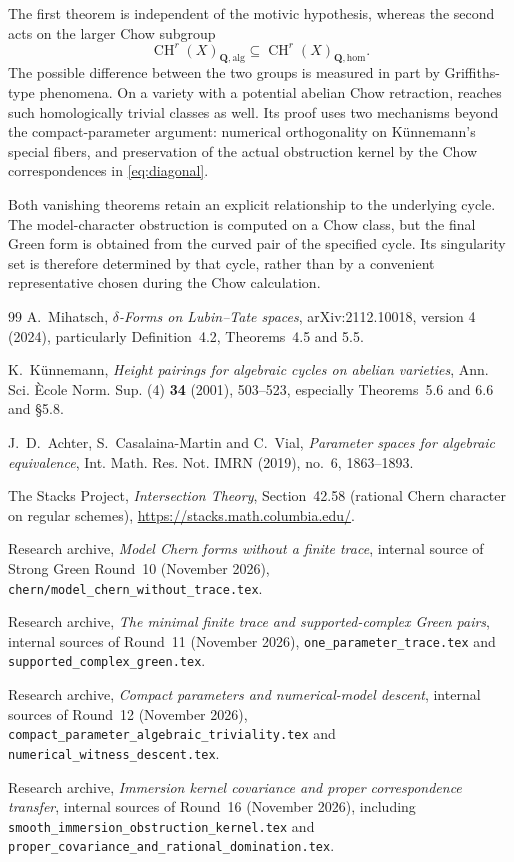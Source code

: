 \documentclass[11pt,reqno]{amsart}
\newcommand{\Eqref}[1]{{\hypersetup{linkcolor=mathpurple}\eqref{#1}}}
\theoremstyle{definition}
\theoremstyle{remark}
\newcommand{\Q}{\mathbf Q}
\newcommand{\CH}{\operatorname{CH}}
\newcommand{\alg}{\mathrm{alg}}
\newcommand{\homol}{\mathrm{hom}}
\numberwithin{equation}{section}
\begin{document}
The first theorem is independent of the motivic hypothesis, whereas
the second acts on the larger Chow subgroup
\[
 \CH^r(X)_{\Q,\alg}\subseteq\CH^r(X)_{\Q,\homol}.
\]
The possible difference between the two groups is measured in part
by Griffiths-type phenomena.  On a variety with a potential abelian
Chow retraction,  reaches such homologically
trivial classes as well.  Its proof uses two mechanisms beyond
the compact-parameter argument: numerical orthogonality on
K\"unnemann's special fibers, and preservation of the actual
obstruction kernel by the Chow correspondences in
\Eqref{eq:diagonal}.

Both vanishing theorems retain an explicit relationship to the
underlying cycle.  The model-character obstruction is computed
on a Chow class, but the final Green form is obtained from the
curved pair of the specified cycle.  Its singularity set is
therefore determined by that cycle, rather than by a convenient
representative chosen during the Chow calculation.

\begin{thebibliography}{99}
A.~Mihatsch, \emph{$\delta$-Forms on Lubin--Tate spaces},
arXiv:2112.10018, version 4 (2024), particularly Definition~4.2,
Theorems~4.5 and 5.5.

K.~K\"unnemann, \emph{Height pairings for algebraic cycles on
abelian varieties}, Ann. Sci. \`Ecole Norm. Sup. (4) \textbf{34}
(2001), 503--523, especially Theorems~5.6 and 6.6 and \S5.8.

J.~D.~Achter, S.~Casalaina-Martin and C.~Vial,
\emph{Parameter spaces for algebraic equivalence},
Int. Math. Res. Not. IMRN (2019), no.~6, 1863--1893.

The Stacks Project, \emph{Intersection Theory},
Section~42.58 (rational Chern character on regular schemes),
\url{https://stacks.math.columbia.edu/}.

Research archive, \emph{Model Chern forms without a finite trace},
internal source of Strong Green Round~10 (November 2026),
\texttt{chern/model\_chern\_without\_trace.tex}.

Research archive, \emph{The minimal finite trace and supported-complex
Green pairs}, internal sources of Round~11 (November 2026),
\texttt{one\_parameter\_trace.tex} and
\texttt{supported\_complex\_green.tex}.

Research archive, \emph{Compact parameters and numerical-model
descent}, internal sources of Round~12 (November 2026),
\texttt{compact\_parameter\_algebraic\_triviality.tex} and
\texttt{numerical\_witness\_descent.tex}.

Research archive, \emph{Immersion kernel covariance and proper
correspondence transfer}, internal sources of Round~16
(November 2026), including
\texttt{smooth\_immersion\_obstruction\_kernel.tex} and
\texttt{proper\_covariance\_and\_rational\_domination.tex}.
\end{thebibliography}
\end{document}

